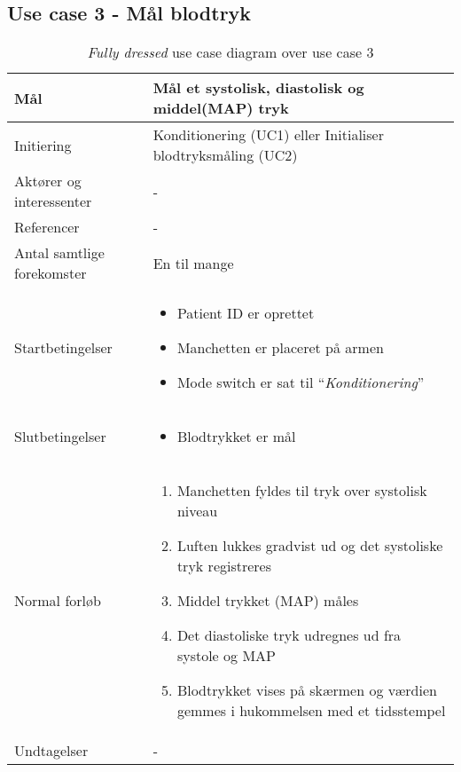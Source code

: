 	\subsection{Use case 3 - Mål blodtryk}
	\begin{table}[H]
		\begin{center}
			\begin{tabular}{ | p{} | p{}| } 
				\hline
				Mål & Mål et systolisk, diastolisk og middel(MAP) tryk\\ 
				\hline
				Initiering &  Konditionering (UC1) eller Initialiser blodtryksmåling (UC2)\\
				\hline
				Aktører og interessenter & - \\
				\hline
				Referencer & - \\ 
				\hline
				Antal samtlige forekomster & En til mange\\ 
				\hline	
				Startbetingelser & 
				\begin{itemize}
					\item Patient ID er oprettet
					\item Manchetten er placeret på armen
					\item Mode switch er sat til “\textit{Konditionering}”
				\end{itemize} \\ 
				\hline
				Slutbetingelser & 
				\begin{itemize}
					\item Blodtrykket er mål
				\end{itemize} \\ 
				\hline
				Normal forløb & \begin{enumerate}
					\setlength\itemsep{0cm} %
					\item Manchetten fyldes til tryk over systolisk niveau 
					\item Luften lukkes gradvist ud og det systoliske tryk registreres 
					\item Middel trykket (MAP) måles 
					\item Det diastoliske tryk udregnes ud fra systole og MAP 
					\item Blodtrykket vises på skærmen og værdien gemmes i hukommelsen med et tidsstempel 
				\end{enumerate} \\ 
				\hline
				Undtagelser & -\\ 
				\hline
			\end{tabular}
		\end{center}
			\caption{\textit{Fully dressed} use case diagram over use case 3}
			\end{table}
			\newpage